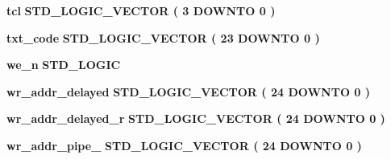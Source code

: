 \begin{DoxyCompactItemize}
\item 
{\bf tcl} {\bfseries \textcolor{comment}{S\+T\+D\+\_\+\+L\+O\+G\+I\+C\+\_\+\+V\+E\+C\+T\+OR}\textcolor{vhdlchar}{ }\textcolor{vhdlchar}{(}\textcolor{vhdlchar}{ }\textcolor{vhdlchar}{ } \textcolor{vhdldigit}{3} \textcolor{vhdlchar}{ }\textcolor{keywordflow}{D\+O\+W\+N\+TO}\textcolor{vhdlchar}{ }\textcolor{vhdlchar}{ } \textcolor{vhdldigit}{0} \textcolor{vhdlchar}{ }\textcolor{vhdlchar}{)}\textcolor{vhdlchar}{ }} 
\item 
{\bf txt\+\_\+code} {\bfseries \textcolor{comment}{S\+T\+D\+\_\+\+L\+O\+G\+I\+C\+\_\+\+V\+E\+C\+T\+OR}\textcolor{vhdlchar}{ }\textcolor{vhdlchar}{(}\textcolor{vhdlchar}{ }\textcolor{vhdlchar}{ } \textcolor{vhdldigit}{23} \textcolor{vhdlchar}{ }\textcolor{keywordflow}{D\+O\+W\+N\+TO}\textcolor{vhdlchar}{ }\textcolor{vhdlchar}{ } \textcolor{vhdldigit}{0} \textcolor{vhdlchar}{ }\textcolor{vhdlchar}{)}\textcolor{vhdlchar}{ }} 
\item 
{\bf we\+\_\+n} {\bfseries \textcolor{comment}{S\+T\+D\+\_\+\+L\+O\+G\+IC}\textcolor{vhdlchar}{ }} 
\item 
{\bf wr\+\_\+addr\+\_\+delayed} {\bfseries \textcolor{comment}{S\+T\+D\+\_\+\+L\+O\+G\+I\+C\+\_\+\+V\+E\+C\+T\+OR}\textcolor{vhdlchar}{ }\textcolor{vhdlchar}{(}\textcolor{vhdlchar}{ }\textcolor{vhdlchar}{ } \textcolor{vhdldigit}{24} \textcolor{vhdlchar}{ }\textcolor{keywordflow}{D\+O\+W\+N\+TO}\textcolor{vhdlchar}{ }\textcolor{vhdlchar}{ } \textcolor{vhdldigit}{0} \textcolor{vhdlchar}{ }\textcolor{vhdlchar}{)}\textcolor{vhdlchar}{ }} 
\item 
{\bf wr\+\_\+addr\+\_\+delayed\+\_\+r} {\bfseries \textcolor{comment}{S\+T\+D\+\_\+\+L\+O\+G\+I\+C\+\_\+\+V\+E\+C\+T\+OR}\textcolor{vhdlchar}{ }\textcolor{vhdlchar}{(}\textcolor{vhdlchar}{ }\textcolor{vhdlchar}{ } \textcolor{vhdldigit}{24} \textcolor{vhdlchar}{ }\textcolor{keywordflow}{D\+O\+W\+N\+TO}\textcolor{vhdlchar}{ }\textcolor{vhdlchar}{ } \textcolor{vhdldigit}{0} \textcolor{vhdlchar}{ }\textcolor{vhdlchar}{)}\textcolor{vhdlchar}{ }} 
\item 
{\bf wr\+\_\+addr\+\_\+pipe\+\_} {\bfseries \textcolor{comment}{S\+T\+D\+\_\+\+L\+O\+G\+I\+C\+\_\+\+V\+E\+C\+T\+OR}\textcolor{vhdlchar}{ }\textcolor{vhdlchar}{(}\textcolor{vhdlchar}{ }\textcolor{vhdlchar}{ } \textcolor{vhdldigit}{24} \textcolor{vhdlchar}{ }\textcolor{keywordflow}{D\+O\+W\+N\+TO}\textcolor{vhdlchar}{ }\textcolor{vhdlchar}{ } \textcolor{vhdldigit}{0} \textcolor{vhdlchar}{ }\textcolor{vhdlchar}{)}\textcolor{vhdlchar}{ }} 
\item 

\end{DoxyCompactItemize}
